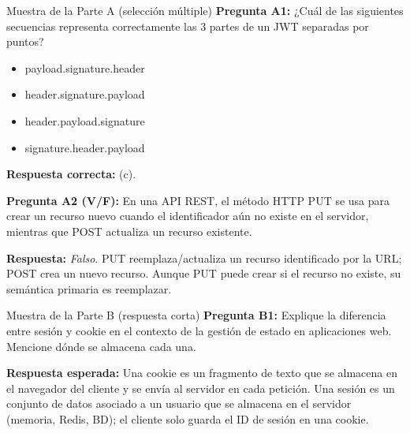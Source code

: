 \documentclass[11pt,a4paper,openany]{book}
\begin{document}
\begin{cajaejemplo}{Muestra de la Parte A (selección múltiple)}
\textbf{Pregunta A1:} ¿Cuál de las siguientes secuencias representa
correctamente las 3 partes de un JWT separadas por puntos?
\begin{itemize}
\item[a)] payload.signature.header
\item[b)] header.signature.payload
\item[c)] header.payload.signature
\item[d)] signature.header.payload
\end{itemize}
\textbf{Respuesta correcta:} (c).

\textbf{Pregunta A2 (V/F):} En una API REST, el método HTTP PUT se
usa para crear un recurso nuevo cuando el identificador aún no existe
en el servidor, mientras que POST actualiza un recurso existente.

\textbf{Respuesta:} \emph{Falso}. PUT reemplaza/actualiza un recurso
identificado por la URL; POST crea un nuevo recurso. Aunque PUT puede
crear si el recurso no existe, su semántica primaria es reemplazar.
\end{cajaejemplo}

\begin{cajaejemplo}{Muestra de la Parte B (respuesta corta)}
\textbf{Pregunta B1:} Explique la diferencia entre sesión y cookie en
el contexto de la gestión de estado en aplicaciones web. Mencione
dónde se almacena cada una.

\textbf{Respuesta esperada:} Una cookie es un fragmento de texto que
se almacena en el navegador del cliente y se envía al servidor en
cada petición. Una sesión es un conjunto de datos asociado a un
usuario que se almacena en el servidor (memoria, Redis, BD); el
cliente solo guarda el ID de sesión en una cookie.
\end{cajaejemplo}
\end{document}
